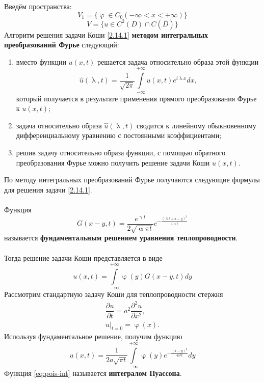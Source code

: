 \documentclass[a4paper, 12pt]{report}
\numberwithin{equation}{section}
\renewcommand{\alpha}{\upalpha}
\renewcommand{\beta}{\upbeta}
\renewcommand{\gamma}{\upgamma}
\renewcommand{\varphi}{\upvarphi}
\renewcommand{\lambda}{\uplambda}
\newcommand{\pderiv}[2]{\dfrac{\partial #1}{\partial #2}}
\begin{document}
	Введём пространства:
	$$V_1= \{\varphi\in C_0(-\infty<x<+\infty)\}$$
	$$V=\{u\in C^2(D)\cap C(\overline{D})\}$$
	Алгоритм решения задачи Коши \eqref{2.14.1} \textbf{методом интегральных преобразований Фурье} следующий:
	\begin{enumerate}
		\item вместо функции $u(x,t)$ решается задача относительно образа этой функции 
		\begin{equation*}
			\hat{u}(\lambda,t)=\frac{1}{\sqrt{2\pi}}\int\limits_{-\infty}^{+\infty}u(x,t)e^{i\lambda x}dx,
		\end{equation*}
		который получается в результате применения прямого преобразования Фурье к $u(x,t)$;
		\item задача относительно образа $\hat{u}(\lambda,t)$ сводится к линейному обыкновенному дифференциальному уравнению с постоянными коэффициентами;
		\item решив задачу относительно образа функции, с помощью обратного преобразования Фурье можно получить решение задачи Коши $u(x,t)$.
	\end{enumerate}
	По методу интегральных преобразований Фурье получаются следующие формулы для решения задачи \eqref{2.14.1}.
	\\\\
	Функция 
	\begin{equation*}
		G(x-y,t)=\frac{e^{\gamma t}}{2\sqrt{\alpha\pi t}}e^{-\frac{(\beta t+x-y)^2}{4\alpha t}}
	\end{equation*}
	называется \textbf{фундаментальным решением уравнения теплопроводности}.
	\\\\
	Тогда решение задачи Коши представляется в виде
	\begin{equation}
		u(x,t)=\int\limits_{-\infty}^{+\infty}\varphi(y)G(x-y,t)dy
	\end{equation}
	Рассмотрим стандартную задачу Коши для теплопроводности стержня
	\begin{equation}
		\begin{gathered}
			\pderiv{u}{t}=a^2\pderiv{^2u}{x^2},\\
			u|_{t=0}=\varphi(x).
		\end{gathered}
	\end{equation}
	Используя фундаментальное решение, получим функцию
	\begin{equation}
		\label{eq:pois-int}
		u(x,t)=\frac{1}{2a\sqrt{\pi t}}\int\limits_{-\infty}^{+\infty}\varphi(y)e^{-\frac{(x-y)^2}{4a^2t}}dy
	\end{equation}
	Функция \eqref{eq:pois-int} называется \textbf{интегралом Пуассона}.
\end{document}
